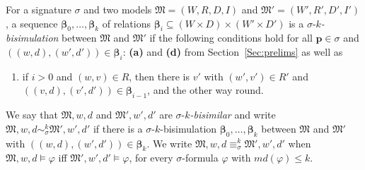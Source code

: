 \documentclass[10pt,a4paper]{amsart}
\theoremstyle{plain}
\newtheorem{lemma}[thm]{Lemma}
\theoremstyle{definition}
\newcommand{\nz}[1]{\textcolor{blue}{\bf!}%
	\marginpar[\parbox{15mm}{\raggedleft\scriptsize\textcolor{blue}{#1}}]%
	{\parbox{15mm}{\raggedright\scriptsize\textcolor{blue}{#1}}}}
\newcommand{\md}{\textit{md}}
\newcommand{\bs}{\boldsymbol{\beta}}
\newcommand{\fform}[1]{\boldsymbol{#1}}
\newcommand{\pvar}{\fform{p}}
\begin{document}
For a signature $\sigma$ and two models $\mathfrak{M}= (W,R,D,I)$ and $\mathfrak{M}'= (W',R',D',I')$, a sequence $\bs_{0},\dots,\bs_{k}$ of relations  
%
$
\bs_{i} \subseteq (W\times D) \times (W'\times D')
$
%
is a $\sigma$-\emph{$k$-bisimulation} between $\mathfrak M$ and $\mathfrak M'$ if the following conditions hold for all $\pvar \in \sigma$ and  $((w,d),(w',d'))\in \bs_{i}$: {\bf (a)} and {\bf (d)} from Section~\ref{Sec:prelims} as well as
%
\begin{enumerate}[style=multiline,leftmargin=0.9cm]
	
\item[\textbf{(w$'$)}] if $i>0$ and $(w,v)\in R$, then there is $v'$ with  \mbox{$(w',v')\in R'$} and $((v,d),(v',d'))\in \bs_{i-1}$, and the other way round.
	
\end{enumerate}
%
We say that $\mathfrak{M},w,d$ and $\mathfrak{M}',w',d'$ are $\sigma$-\emph{$k$-bisimilar} and write 
%
$\mathfrak{M},w,d  \sim_{\sigma}^{k} \mathfrak{M}',w',d'$
%
if there is a $\sigma$-$k$-bisimulation $\bs_{0},\dots,\bs_{k}$ between $\mathfrak{M}$ and $\mathfrak{M}'$  with $((w,d),(w',d')) \in \bs_{k}$. We write
$\mathfrak{M},w,d  \equiv_{\sigma}^{k} \mathfrak{M}',w',d'$ when 
$\mathfrak{M},w, d \models \varphi$ iff $\mathfrak{M}',w', d'\models \varphi$, for every $\sigma$-formula $\varphi$ with $\md(\varphi)\leq k$.
%

\end{document}

